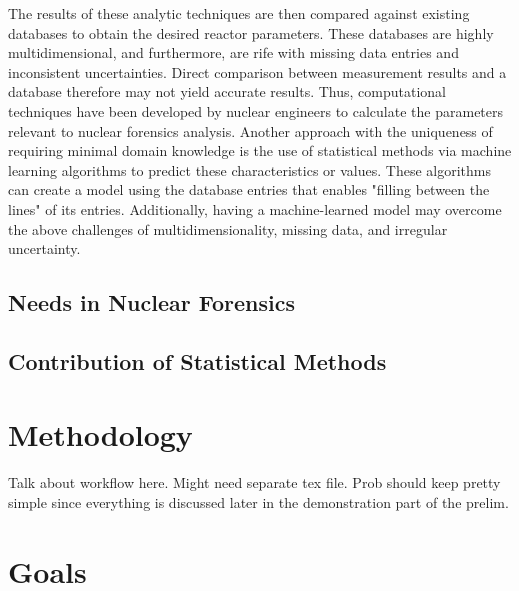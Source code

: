 The results of these analytic techniques are then compared against existing
databases to obtain the desired reactor parameters. These databases are highly
multidimensional, and furthermore, are rife with missing data entries and
inconsistent uncertainties. Direct comparison between measurement results and a
database therefore may not yield accurate results. Thus, computational
techniques have been developed by nuclear engineers to calculate the parameters
relevant to nuclear forensics analysis.  Another approach with the uniqueness of requiring minimal domain
knowledge is the use of statistical methods via machine learning algorithms to
predict these characteristics or values. These algorithms can create a model
using the database entries that enables "filling between the lines" of its
entries. Additionally, having a machine-learned model may overcome the above
challenges of multidimensionality, missing data, and irregular uncertainty.

\subsection{Needs in Nuclear Forensics}


\subsection{Contribution of Statistical Methods}


\section{Methodology}
\label{sec:methodology}

Talk about workflow here. Might need separate tex file. Prob should keep pretty
simple since everything is discussed later in the demonstration part of the
prelim. 

\section{Goals}

